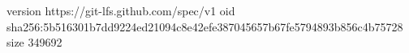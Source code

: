 version https://git-lfs.github.com/spec/v1
oid sha256:5b516301b7dd9224ed21094c8e42efe387045657b67fe5794893b856c4b75728
size 349692
